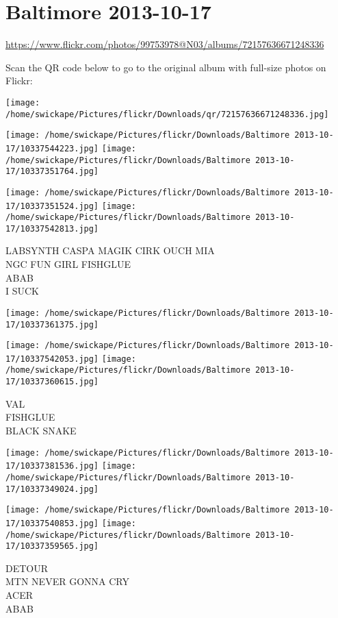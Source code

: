 \documentclass[10pt,letterpaper]{article}
\title{}
\author{}
\date{}
\begin{document}
\section*{Baltimore 2013-10-17}

\url{https://www.flickr.com/photos/99753978@N03/albums/72157636671248336}

Scan the QR code below to go to the original album with full-size photos on Flickr:

\texttt{[image: /home/swickape/Pictures/flickr/Downloads/qr/72157636671248336.jpg]}
\pagebreak

\texttt{[image: /home/swickape/Pictures/flickr/Downloads/Baltimore 2013-10-17/10337544223.jpg]}
\texttt{[image: /home/swickape/Pictures/flickr/Downloads/Baltimore 2013-10-17/10337351764.jpg]}

\texttt{[image: /home/swickape/Pictures/flickr/Downloads/Baltimore 2013-10-17/10337351524.jpg]}
\texttt{[image: /home/swickape/Pictures/flickr/Downloads/Baltimore 2013-10-17/10337542813.jpg]}

LABSYNTH CASPA MAGIK CIRK OUCH MIA\\
NGC FUN GIRL FISHGLUE\\
ABAB\\
I SUCK
\pagebreak

\texttt{[image: /home/swickape/Pictures/flickr/Downloads/Baltimore 2013-10-17/10337361375.jpg]}

\vspace{0.25in}
\texttt{[image: /home/swickape/Pictures/flickr/Downloads/Baltimore 2013-10-17/10337542053.jpg]}
\texttt{[image: /home/swickape/Pictures/flickr/Downloads/Baltimore 2013-10-17/10337360615.jpg]}

VAL\\
FISHGLUE\\
BLACK SNAKE
\pagebreak

\texttt{[image: /home/swickape/Pictures/flickr/Downloads/Baltimore 2013-10-17/10337381536.jpg]}
\texttt{[image: /home/swickape/Pictures/flickr/Downloads/Baltimore 2013-10-17/10337349024.jpg]}

\texttt{[image: /home/swickape/Pictures/flickr/Downloads/Baltimore 2013-10-17/10337540853.jpg]}
\texttt{[image: /home/swickape/Pictures/flickr/Downloads/Baltimore 2013-10-17/10337359565.jpg]}

DETOUR\\
MTN NEVER GONNA CRY\\
ACER\\
ABAB
\pagebreak
\end{document}
